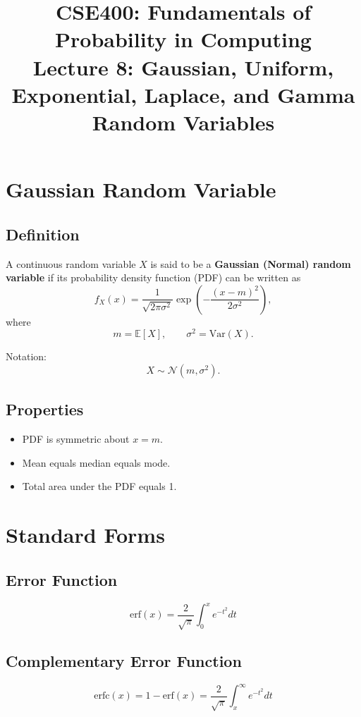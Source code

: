 \documentclass[12pt]{article}
\title{CSE400: Fundamentals of Probability in Computing\\
Lecture 8: Gaussian, Uniform, Exponential, Laplace, and Gamma Random Variables}
\author{}
\date{}
\begin{document}
\maketitle

\section*{Gaussian Random Variable}

\subsection*{Definition}

A continuous random variable $X$ is said to be a \textbf{Gaussian (Normal) random variable} if its probability density function (PDF) can be written as
\[
f_X(x) = \frac{1}{\sqrt{2\pi\sigma^2}} \exp\left(-\frac{(x-m)^2}{2\sigma^2}\right),
\]
where
\[
m = \mathbb{E}[X], \qquad \sigma^2 = \text{Var}(X).
\]

Notation:
\[
X \sim \mathcal{N}(m,\sigma^2).
\]

\subsection*{Properties}

\begin{itemize}
\item PDF is symmetric about $x=m$.
\item Mean equals median equals mode.
\item Total area under the PDF equals 1.
\end{itemize}

\section*{Standard Forms}

\subsection*{Error Function}

\[
\mathrm{erf}(x) = \frac{2}{\sqrt{\pi}} \int_{0}^{x} e^{-t^2} dt
\]

\subsection*{Complementary Error Function}

\[
\mathrm{erfc}(x) = 1 - \mathrm{erf}(x)
= \frac{2}{\sqrt{\pi}} \int_{x}^{\infty} e^{-t^2} dt
\]
\end{document}
